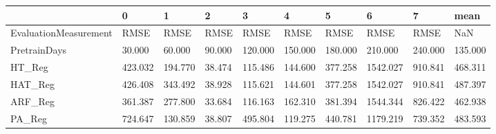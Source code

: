 \begin{tabular}{llllllllll}
\toprule
{} &       0 &       1 &      2 &       3 &       4 &       5 &        6 &       7 &    mean \\
\midrule
EvaluationMeasurement &    RMSE &    RMSE &   RMSE &    RMSE &    RMSE &    RMSE &     RMSE &    RMSE &     NaN \\
PretrainDays          &  30.000 &  60.000 & 90.000 & 120.000 & 150.000 & 180.000 &  210.000 & 240.000 & 135.000 \\
HT\_Reg                & 423.032 & 194.770 & 38.474 & 115.486 & 144.600 & 377.258 & 1542.027 & 910.841 & 468.311 \\
HAT\_Reg               & 426.408 & 343.492 & 38.928 & 115.621 & 144.601 & 377.258 & 1542.027 & 910.841 & 487.397 \\
ARF\_Reg               & 361.387 & 277.800 & 33.684 & 116.163 & 162.310 & 381.394 & 1544.344 & 826.422 & 462.938 \\
PA\_Reg                & 724.647 & 130.859 & 38.807 & 495.804 & 119.275 & 440.781 & 1179.219 & 739.352 & 483.593 \\
\bottomrule
\end{tabular}
